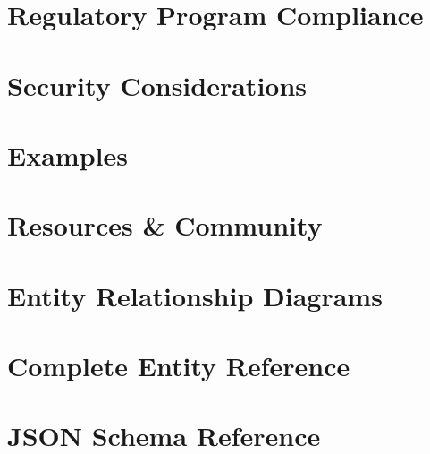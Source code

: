 \documentclass{article}
\begin{document}

\section{Regulatory Program Compliance}
\label{sec:regulatory-compliance}


\section{Security Considerations}
\label{sec:security}



\section{Examples}
\label{sec:examples}


\section{Resources \& Community}
\label{sec:resources-community}



\appendix

\section{Entity Relationship Diagrams}
\label{app:erd}


\section{Complete Entity Reference}
\label{app:entity-reference}


\section{JSON Schema Reference}
\label{app:schema-reference}

\end{document}
